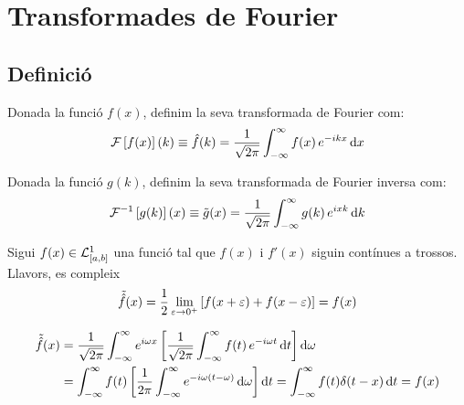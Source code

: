 \section{Transformades de Fourier}
\subsection{Definició}

\begin{defi}
    Donada la funció $f(x)$, definim la seva transformada de Fourier com:
    \begin{align}
        \mathcal{F}\left[ f(x) \right](k) \equiv \hat{f}(k) = \frac{1}{\sqrt{2\pi}} \int_{-\infty}^{\infty} f(x)\,e^{-ikx} \mathop{}\!\mathrm{d} x
    \end{align}
\end{defi}

\begin{defi}
    Donada la funció $g(k)$, definim la seva transformada de Fourier inversa com:
    \begin{align}
        \mathcal{F}^{-1}\left[ g(k) \right](x) \equiv \tilde{g}(x) = \frac{1}{\sqrt{2\pi}} \int_{-\infty}^{\infty} g(k)\,e^{ixk} \mathop{}\!\mathrm{d} k
    \end{align}
\end{defi}

\begin{thm}
    Sigui $f(x) \in \mathcal{L}^{1}_{[a,b]}$ una funció tal que $f(x)$ i $f'(x)$ siguin contínues a trossos. Llavors, es compleix
    \begin{align*}
        \tilde{\hat{f}}(x) = \frac{1}{2} \lim_{\varepsilon \to 0^{+}} \left[ f(x + \varepsilon) + f(x - \varepsilon) \right] = f(x)
    \end{align*}
\end{thm}
\begin{sproof}
    \begin{align*}
    \begin{aligned}
        \tilde{\hat{f}}(x) &= \frac{1}{\sqrt{2\pi}} \int_{-\infty}^{\infty} e^{i \omega x} \left[ \frac{1}{\sqrt{2\pi}} \int_{-\infty}^{\infty} f(t)\,e^{-i\omega t} \mathop{}\!\mathrm{d} t \right] \mathop{}\!\mathrm{d} \omega \\
        &= \int_{-\infty}^{\infty} f(t) \left[ \frac{1}{2\pi} \int_{-\infty}^{\infty} e^{-i\omega (t-\omega)} \mathop{}\!\mathrm{d} \omega \right] \mathop{}\!\mathrm{d} t = \int_{-\infty}^{\infty} f(t) \delta(t-x) \mathop{}\!\mathrm{d} t  = f(x)
    \end{aligned}
    \end{align*}
\end{sproof}


